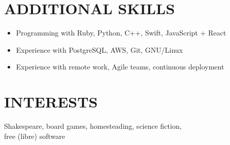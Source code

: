 \documentclass[centered, margin, 11pt]{res} %
\newcommand\mainsectionfont{\fontsize{10.5pt}{14pt}\selectfont\bf\textup}
\renewcommand\sectionfont{\mainsectionfont} %
\newenvironment{rlist}
    {\begin{minipage}[t]{\linewidth}\begin{itemize}\raggedright}
    {\end{itemize}\end{minipage}}
\begin{document}
\begin{resume}
\renewcommand\sectionfont{\mainsectionfont} %


\section{ADDITIONAL SKILLS}
\begin{rlist}
  \item Programming with Ruby, Python, C++, Swift, JavaScript + React
  \item Experience with PostgreSQL, AWS, Git, GNU/Linux
  \item Experience with remote work, Agile teams, continuous deployment
\end{rlist}


\section{INTERESTS}
Shakespeare, board games, homesteading, science fiction, \\
free (libre) software


\end{resume}
\end{document}
